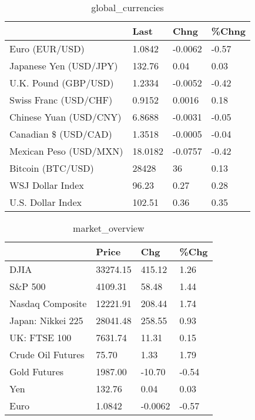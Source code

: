 \documentclass{article}%
\begin{document}
%


\begin{table}[htbp]%
\caption{global\_currencies}%
\centering%
\begin{adjustbox}{width=1\textwidth}%
\begin{tabular}{llll}
\toprule
                       &    Last &    Chng & \%Chng \\
\midrule
        Euro (EUR/USD) &  1.0842 & -0.0062 & -0.57 \\
Japanese Yen (USD/JPY) &  132.76 &    0.04 &  0.03 \\
  U.K. Pound (GBP/USD) &  1.2334 & -0.0052 & -0.42 \\
 Swiss Franc (USD/CHF) &  0.9152 &  0.0016 &  0.18 \\
Chinese Yuan (USD/CNY) &  6.8688 & -0.0031 & -0.05 \\
  Canadian \$ (USD/CAD) &  1.3518 & -0.0005 & -0.04 \\
Mexican Peso (USD/MXN) & 18.0182 & -0.0757 & -0.42 \\
     Bitcoin (BTC/USD) &   28428 &      36 &  0.13 \\
      WSJ Dollar Index &   96.23 &    0.27 &  0.28 \\
     U.S. Dollar Index &  102.51 &    0.36 &  0.35 \\
\bottomrule
\end{tabular}
%
\end{adjustbox}%
\end{table}

%


\begin{table}[htbp]%
\caption{market\_overview}%
\centering%
\begin{adjustbox}{width=1\textwidth}%
\begin{tabular}{llll}
\toprule
                  &    Price &     Chg &  \%Chg \\
\midrule
             DJIA & 33274.15 &  415.12 &  1.26 \\
          S\&P 500 &  4109.31 &   58.48 &  1.44 \\
 Nasdaq Composite & 12221.91 &  208.44 &  1.74 \\
Japan: Nikkei 225 & 28041.48 &  258.55 &  0.93 \\
     UK: FTSE 100 &  7631.74 &   11.31 &  0.15 \\
Crude Oil Futures &    75.70 &    1.33 &  1.79 \\
     Gold Futures &  1987.00 &  -10.70 & -0.54 \\
              Yen &   132.76 &    0.04 &  0.03 \\
             Euro &   1.0842 & -0.0062 & -0.57 \\
\bottomrule
\end{tabular}
%
\end{adjustbox}%
\end{table}

%
\end{document}
